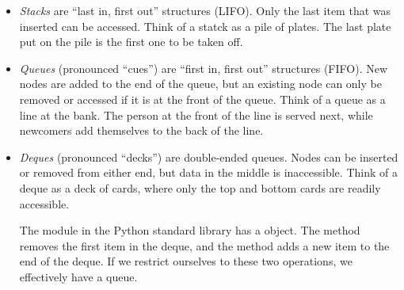 \begin{itemize}
\item \emph{Stacks} are ``last in, first out'' structures (LIFO).
Only the last item that was inserted can be accessed.
Think of a statck as a pile of plates.
The last plate put on the pile is the first one to be taken off.

\item \emph{Queues} (pronounced ``cues'') are ``first in, first out'' structures (FIFO).
New nodes are added to the end of the queue, but an existing node can only be removed or accessed if it is at the front of the queue.
Think of a queue as a line at the bank.
The person at the front of the line is served next, while newcomers add themselves to the back of the line.

\item \emph{Deques} (pronounced ``decks'') are double-ended queues. Nodes can be inserted or removed from either end, but data in the middle is inaccessible.
Think of a deque as a deck of cards, where only the top and bottom cards are readily accessible.

The  module in the Python standard library has a  object.
The  method removes the first item in the deque, and the  method adds a new item to the end of the deque.
If we restrict ourselves to these two operations, we effectively have a queue.
\end{itemize}


